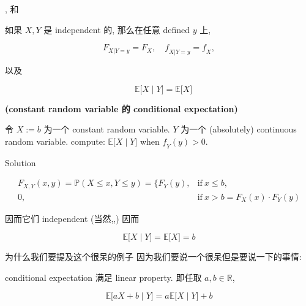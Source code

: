 \begin{proposition}{,
 和
}

如果 \(\mathit{X},\mathit{Y}\) 是 independent 的, 那么在任意 defined \(\mathit{y}\) 上,

\[\mathit{F}_{\mathit{X}|\mathit{Y} = \mathit{y}} = \mathit{F}_{\mathit{X}},\quad\mathit{f}_{\mathit{X}|\mathit{Y} = \mathit{y}} = \mathit{f}_{\mathit{X}},\]

以及

\[\left. \quad\mathbb{E}\lbrack\mathit{X} \middle| \mathit{Y}\rbrack = \mathbb{E}\lbrack\mathit{X}\rbrack \right.\]

\end{proposition}

\begin{example}

\textbf{(constant random variable 的 conditional expectation)}

令 \(\mathit{X} := \mathit{b}\) 为一个 constant random variable. \(\mathit{Y}\) 为一个 (absolutely) continuous random variable. compute: \(\left. \mathbb{E}\lbrack\mathit{X} \middle| \mathit{Y}\rbrack \right.\) when \(\mathit{f}_{\mathit{Y}}(\mathit{y}) > 0\).

\end{example}

\begin{qlsolution}{Solution}

\[\begin{matrix}
{\mathit{F}_{\mathit{X},\mathit{Y}}(\mathit{x},\mathit{y}) = \mathbb{P}(\mathit{X} \leq \mathit{x},\mathit{Y} \leq \mathit{y}) = \{\mathit{F}_{\mathit{Y}}(\mathit{y}),} & {\text{if}\ \mathit{x} \leq \mathit{b},} \\
{0,} & {\text{if}\ \mathit{x} > \mathit{b} = \mathit{F}_{\mathit{X}}(\mathit{x}) \cdot \mathit{F}_{\mathit{Y}}(\mathit{y})}
\end{matrix}\]

因而它们 independent (当然,,) 因而

\[\left. \mathbb{E}\lbrack\mathit{X} \middle| \mathit{Y}\rbrack = \mathbb{E}\lbrack\mathit{X}\rbrack = \mathit{b} \right.\]

\end{qlsolution}

为什么我们要提及这个很呆的例子 因为我们要说一个很呆但是要说一下的事情:

\begin{proposition}

conditional expectation 满足 linear property. 即任取 \(\mathit{a},\mathit{b} \in \mathbb{R}\),

\[\left. \mathbb{E}\lbrack\mathit{a}\mathit{X} + \mathit{b} \middle| \mathit{Y}\rbrack = \mathit{a}\mathbb{E}\lbrack\mathit{X} \middle| \mathit{Y}\rbrack + \mathit{b} \right.\]

\end{proposition}

